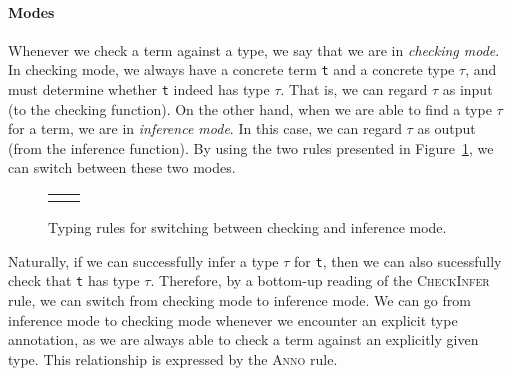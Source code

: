\paragraph{Modes}
Whenever we check a term against a type, we say that we are in \emph{checking mode}. In checking mode, we always have a concrete term \texttt{t} and a concrete type $\tau$, and must determine whether \texttt{t} indeed has type $\tau$. That is, we can regard $\tau$ as input (to the checking function). On the other hand, when we are able to find a type $\tau$ for a term, we are in \emph{inference mode}. In this case, we can regard $\tau$ as output (from the inference function). By using the two rules presented in Figure~\ref{fig:bidirectional-modes}, we can switch between these two modes.

\newsavebox{\ptCheckInfer}
\begin{lrbox}{\ptCheckInfer}
\begin{varwidth}{\linewidth}
\begin{prooftree}
\end{prooftree}
\end{varwidth}
\end{lrbox}

\newsavebox{\ptAnno}
\begin{lrbox}{\ptAnno}
\begin{varwidth}{\linewidth}
\begin{prooftree}
\end{prooftree}
\end{varwidth}
\end{lrbox}

\begin{figure}
\begin{center}
\begin{tabu}{c c}
\usebox{\ptCheckInfer} & \usebox{\ptAnno}
\end{tabu}
\end{center}
\caption{Typing rules for switching between checking and inference mode.}
\label{fig:bidirectional-modes}
\end{figure}

Naturally, if we can successfully infer a type $\tau$ for \texttt{t}, then we can also sucessfully check that \texttt{t} has type $\tau$. Therefore, by a bottom-up reading of the \textsc{CheckInfer} rule, we can switch from checking mode to inference mode. We can go from inference mode to checking mode whenever we encounter an explicit type annotation, as we are always able to check a term against an explicitly given type. This relationship is expressed by the \textsc{Anno} rule.



